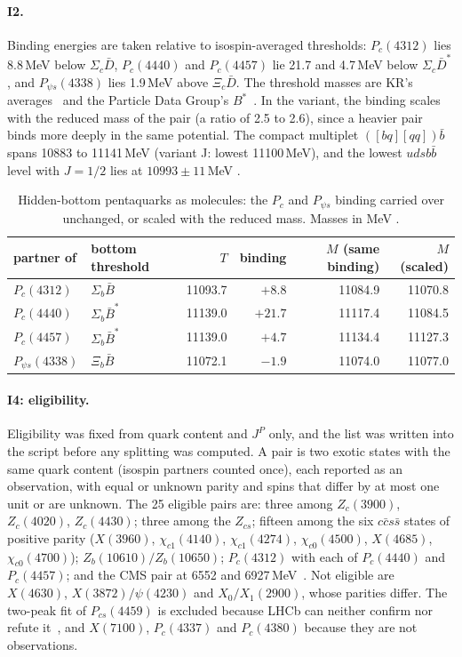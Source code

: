 \paragraph{I2.} Binding energies are taken relative to isospin-averaged thresholds: $P_c(4312)$ lies 8.8\,MeV below $\Sigma_c\bar D$,
$P_c(4440)$ and $P_c(4457)$ lie 21.7 and 4.7\,MeV below $\Sigma_c\bar D^*$, and $P_{\psi s}(4338)$ lies 1.9\,MeV above $\Xi_c\bar D$. The
threshold masses are KR's averages~\cite{karliner2014} and the Particle Data Group's $B^*$~\cite{navas2024}. In the variant, the binding
scales with the reduced mass of the pair (a ratio of 2.5 to 2.6), since a heavier pair binds more deeply in the same potential. The
compact multiplet $([bq][qq])\bar b$ spans 10883 to 11141\,MeV (variant J: lowest 11100\,MeV), and the lowest $udsb\bar b$ level with
$J=1/2$ lies at $10993\pm11$\,MeV .

\begin{table}[tbp]\centering\footnotesize
\caption{Hidden-bottom pentaquarks as molecules: the $P_c$ and $P_{\psi s}$ binding carried over unchanged, or scaled with the reduced
mass. Masses in MeV .}
\label{tab:exo-pb}
\begin{tabular}{@{}llrrrr@{}}
\toprule
partner of & bottom threshold & $T$ & binding & $M$ (same binding) & $M$ (scaled) \\
\midrule
$P_c(4312)$ & $\Sigma_b\bar B$ & 11093.7 & $+8.8$ & 11084.9 & 11070.8 \\
$P_c(4440)$ & $\Sigma_b\bar B^*$ & 11139.0 & $+21.7$ & 11117.4 & 11084.5 \\
$P_c(4457)$ & $\Sigma_b\bar B^*$ & 11139.0 & $+4.7$ & 11134.4 & 11127.3 \\
$P_{\psi s}(4338)$ & $\Xi_b\bar B$ & 11072.1 & $-1.9$ & 11074.0 & 11077.0 \\
\bottomrule
\end{tabular}
\end{table}

\paragraph{I4: eligibility.} Eligibility was fixed from quark content and $J^P$ only, and the list was written into the script before
any splitting was computed. A pair is two exotic states with the same quark content (isospin partners counted once), each reported as an
observation, with equal or unknown parity and spins that differ by at most one unit or are unknown. The 25 eligible pairs are: three
among $Z_c(3900)$, $Z_c(4020)$, $Z_c(4430)$; three among the $Z_{cs}$; fifteen among the six $c\bar cs\bar s$ states of positive parity
($X(3960)$, $\chi_{c1}(4140)$, $\chi_{c1}(4274)$, $\chi_{c0}(4500)$, $X(4685)$, $\chi_{c0}(4700)$); $Z_b(10610)/Z_b(10650)$; $P_c(4312)$
with each of $P_c(4440)$ and $P_c(4457)$; and the CMS pair at 6552 and 6927\,MeV~\cite{cms2024h}. Not eligible are $X(4630)$,
$X(3872)/\psi(4230)$ and $X_0/X_1(2900)$, whose parities differ. The two-peak fit of $P_{cs}(4459)$ is excluded because LHCb can neither
confirm nor refute it~\cite{lhcb2021h}, and $X(7100)$, $P_c(4337)$ and $P_c(4380)$ because they are not observations.

